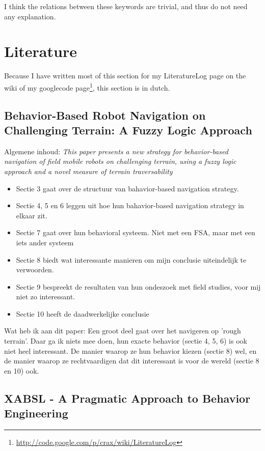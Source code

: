 \documentclass[a4paper,10pt]{article}
\begin{document}
I think the relations between these keywords are trivial, and thus do not need
any explanation.

\section{Literature}
Because I have written most of this section for my LiteratureLog page on the
wiki of my googlecode
page\footnote{\url{http://code.google.com/p/crax/wiki/LiteratureLog}}, this
section is in
dutch.
\subsection*{Behavior-Based Robot Navigation on Challenging Terrain: A Fuzzy
Logic Approach\cite{seraji2002behavior}}
Algemene inhoud:
\textit{This paper presents a new strategy for behavior-based navigation of field mobile
robots on challenging terrain, using a fuzzy logic approach and a novel measure
of terrain traversability}

\begin{itemize}
\item Sectie 3 gaat over de structuur van bahavior-based navigation strategy.
\item Sectie 4, 5 en 6 leggen uit hoe hun bahavior-based navigation strategy in elkaar
zit.
\item Sectie 7 gaat over hun behavioral systeem. Niet met een FSA, maar met een iets
ander systeem
\item Sectie 8 biedt wat interessante manieren om mijn conclusie uiteindelijk te
verwoorden.
\item Sectie 9 bespreekt de resultaten van hun ondeszoek met field studies, voor mij
niet zo interessant.
\item Sectie 10 heeft de daadwerkelijke conclusie
\end{itemize}

Wat heb ik aan dit paper:
Een groot deel gaat over het navigeren op 'rough terrain'. Daar ga ik niets mee
doen, hun exacte behavior (sectie 4, 5, 6) is ook niet heel interessant. De
manier waarop ze hun behavior kiezen (sectie 8) wel, en de manier waarop ze
rechtvaardigen dat dit interessant is voor de wereld (sectie 8 en 10) ook.

\subsection*{XABSL - A Pragmatic Approach to Behavior
Engineering\cite{loetzsch2006xabsl}}
\end{document}
